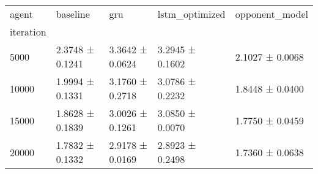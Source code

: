 \begin{tabular}{lllll}
\toprule
agent & baseline & gru & lstm_optimized & opponent_model \\
iteration &  &  &  &  \\
\midrule
5000 & 2.3748 ± 0.1241 & 3.3642 ± 0.0624 & 3.2945 ± 0.1602 & 2.1027 ± 0.0068 \\
10000 & 1.9994 ± 0.1331 & 3.1760 ± 0.2718 & 3.0786 ± 0.2232 & 1.8448 ± 0.0400 \\
15000 & 1.8628 ± 0.1839 & 3.0026 ± 0.1261 & 3.0850 ± 0.0070 & 1.7750 ± 0.0459 \\
20000 & 1.7832 ± 0.1332 & 2.9178 ± 0.0169 & 2.8923 ± 0.2498 & 1.7360 ± 0.0638 \\
\bottomrule
\end{tabular}

